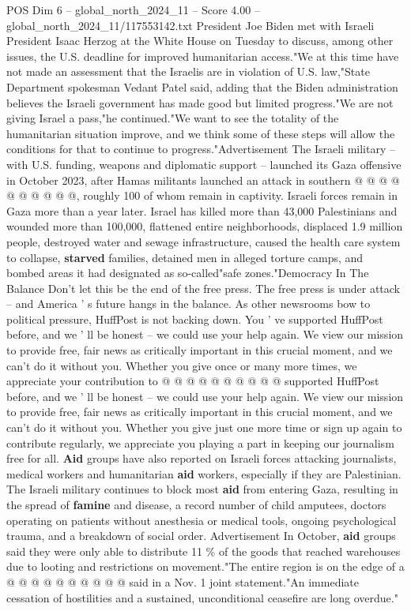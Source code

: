 \begin{textsample}{POS Dim 6 – global\_north\_2024\_11 – Score 4.00 – global\_north\_2024\_11/117553142.txt}
President Joe Biden met with Israeli President Isaac Herzog at the White House on Tuesday to discuss, among other issues, the U.S. deadline for improved humanitarian access."We at this time have not made an assessment that the Israelis are in violation of U.S. law,"State Department spokesman Vedant Patel said, adding that the Biden administration believes the Israeli government has made good but limited progress."We are not giving Israel a pass,"he continued."We want to see the totality of the humanitarian situation improve, and we think some of these steps will allow the conditions for that to continue to progress."Advertisement The Israeli military -- with U.S. funding, weapons and diplomatic support -- launched its Gaza offensive in October 2023, after Hamas militants launched an attack in southern @ @ @ @ @ @ @ @ @ @, roughly 100 of whom remain in captivity.
Israeli forces remain in Gaza more than a year later.
Israel has killed more than 43,000 Palestinians and wounded more than 100,000, flattened entire neighborhoods, displaced 1.9 million people, destroyed water and sewage infrastructure, caused the health care system to collapse, \textbf{starved} families, detained men in alleged torture camps, and bombed areas it had designated as so-called"safe zones."Democracy In The Balance Don't let this be the end of the free press.
The free press is under attack -- and America ' s future hangs in the balance.
As other newsrooms bow to political pressure, HuffPost is not backing down.
You ' ve supported HuffPost before, and we ' ll be honest -- we could use your help again.
We view our mission to provide free, fair news as critically important in this crucial moment, and we can't do it without you.
Whether you give once or many more times, we appreciate your contribution to @ @ @ @ @ @ @ @ @ @ supported HuffPost before, and we ' ll be honest -- we could use your help again.
We view our mission to provide free, fair news as critically important in this crucial moment, and we can't do it without you.
Whether you give just one more time or sign up again to contribute regularly, we appreciate you playing a part in keeping our journalism free for all. \textbf{Aid} groups have also reported on Israeli forces attacking journalists, medical workers and humanitarian \textbf{aid} workers, especially if they are Palestinian.
The Israeli military continues to block most \textbf{aid} from entering Gaza, resulting in the spread of \textbf{famine} and disease, a record number of child amputees, doctors operating on patients without anesthesia or medical tools, ongoing psychological trauma, and a breakdown of social order.
Advertisement In October, \textbf{aid} groups said they were only able to distribute 11 \% of the goods that reached warehouses due to looting and restrictions on movement."The entire region is on the edge of a @ @ @ @ @ @ @ @ @ @ said in a Nov. 1 joint statement."An immediate cessation of hostilities and a sustained, unconditional ceasefire are long overdue."

\end{textsample}
